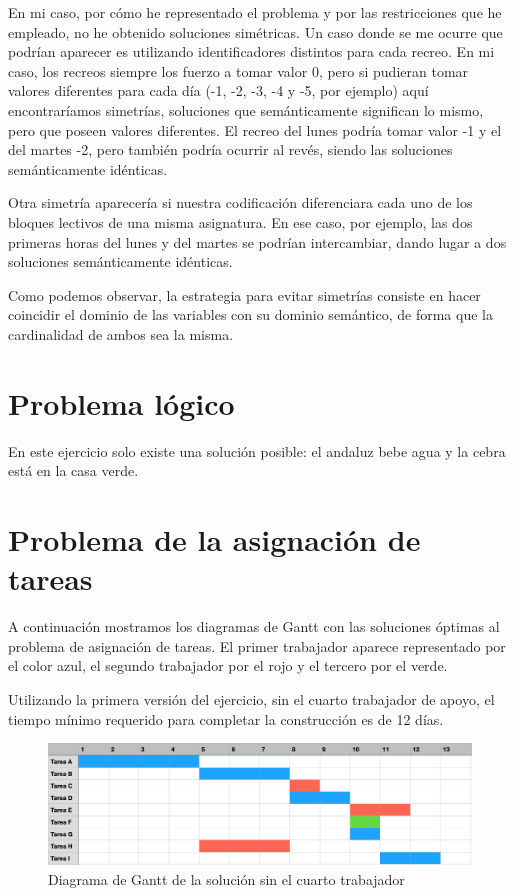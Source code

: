 \documentclass[12pt]{article} %
\begin{document}
En mi caso, por cómo he representado el problema y por las restricciones que he empleado, no he obtenido soluciones simétricas. Un caso donde se me ocurre que podrían aparecer es utilizando identificadores distintos para cada recreo. En mi caso, los recreos siempre los fuerzo a tomar valor 0, pero si pudieran tomar valores diferentes para cada día (-1, -2, -3, -4 y -5, por ejemplo) aquí encontraríamos simetrías, soluciones que semánticamente significan lo mismo, pero que poseen valores diferentes. El recreo del lunes podría tomar valor -1 y el del martes -2, pero también podría ocurrir al revés, siendo las soluciones semánticamente idénticas.

Otra simetría aparecería si nuestra codificación diferenciara cada uno de los bloques lectivos de una misma asignatura. En ese caso, por ejemplo, las dos primeras horas del lunes y del martes se podrían intercambiar, dando lugar a dos soluciones semánticamente idénticas.

Como podemos observar, la estrategia para evitar simetrías consiste en hacer coincidir el dominio de las variables con su dominio semántico, de forma que la cardinalidad de ambos sea la misma.

\section{Problema lógico}
En este ejercicio solo existe una solución posible: el andaluz bebe agua y la cebra está en la casa verde.

\section{Problema de la asignación de tareas}
A continuación mostramos los diagramas de Gantt con las soluciones óptimas al problema de asignación de tareas. El primer trabajador aparece representado por el color azul, el segundo trabajador por el rojo y el tercero por el verde.

Utilizando la primera versión del ejercicio, sin el cuarto trabajador de apoyo, el tiempo mínimo requerido para completar la construcción es de 12 días.

\begin{figure}[H] %
    \centering
        \includegraphics[scale=0.32]{gantt.png}
        \caption{Diagrama de Gantt de la solución sin el cuarto trabajador}
\end{figure}
\end{document}
